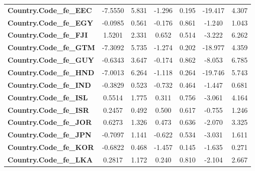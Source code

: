 \begin{center}
\begin{tabular}{lcccccc}
\textbf{Country.Code\_fe\_EEC}                            &      -7.5550  &        5.831     &    -1.296  &         0.195        &      -19.417    &        4.307     \\
\textbf{Country.Code\_fe\_EGY}                            &      -0.0985  &        0.561     &    -0.176  &         0.861        &       -1.240    &        1.043     \\
\textbf{Country.Code\_fe\_FJI}                            &       1.5201  &        2.331     &     0.652  &         0.514        &       -3.222    &        6.262     \\
\textbf{Country.Code\_fe\_GTM}                            &      -7.3092  &        5.735     &    -1.274  &         0.202        &      -18.977    &        4.359     \\
\textbf{Country.Code\_fe\_GUY}                            &      -0.6343  &        3.647     &    -0.174  &         0.862        &       -8.053    &        6.785     \\
\textbf{Country.Code\_fe\_HND}                            &      -7.0013  &        6.264     &    -1.118  &         0.264        &      -19.746    &        5.743     \\
\textbf{Country.Code\_fe\_IND}                            &      -0.3829  &        0.523     &    -0.732  &         0.464        &       -1.447    &        0.681     \\
\textbf{Country.Code\_fe\_ISL}                            &       0.5514  &        1.775     &     0.311  &         0.756        &       -3.061    &        4.164     \\
\textbf{Country.Code\_fe\_ISR}                            &       0.2457  &        0.492     &     0.500  &         0.617        &       -0.755    &        1.246     \\
\textbf{Country.Code\_fe\_JOR}                            &       0.6273  &        1.326     &     0.473  &         0.636        &       -2.070    &        3.325     \\
\textbf{Country.Code\_fe\_JPN}                            &      -0.7097  &        1.141     &    -0.622  &         0.534        &       -3.031    &        1.611     \\
\textbf{Country.Code\_fe\_KOR}                            &      -0.6822  &        0.468     &    -1.457  &         0.145        &       -1.635    &        0.271     \\
\textbf{Country.Code\_fe\_LKA}                            &       0.2817  &        1.172     &     0.240  &         0.810        &       -2.104    &        2.667     \\

\end{tabular}
\end{center}
